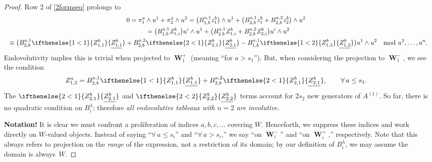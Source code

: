 \documentclass[pdftex]{sigma}
\numberwithin{equation}{section}
\DeclareMathOperator{\Wu}{\mathbf{W}}
\newcommand{\Z}[3]{\ifthenelse{#1<#2}{\ensuremath{Z^{#3}_{#1,#2}}}{\ensuremath{\underline{Z^{#3}_{#1,#2}}}}}
\begin{document}
\begin{proof}
Row 2 of \eqref{2formseq} prolongs to
\begin{gather*}
0 = \pi^a_1 \wedge u^1 + \pi^a_2 \wedge u^2
  =
    \big( B^{a,1}_{1,b} z^b_1 \big)\wedge u^1
   +\big( B^{a,1}_{2,b} z^b_1
         + B^{a,2}_{2,b} z^b_2 \big)\wedge u^2\\
\hphantom{0}{} =
    \big( B^{a,1}_{1,b} Z^b_{1,i} \big)u^i\wedge u^1
   +\big( B^{a,1}_{2,b} Z^b_{1,i}
         + B^{a,2}_{2,b} Z^b_{2,i} \big)u^i\wedge u^2\\
\hphantom{0}{}
\equiv
    \big( B^{a,1}_{2,b} \Z{1}{1}{b}
         + B^{a,2}_{2,b} \Z{2}{1}{b}
         - B^{a,1}_{1,b} \Z{1}{2}{b}
         \big)u^1\wedge u^2 \ \mod u^3, \ldots, u^n.
\end{gather*}
Endovolutivity implies this is trivial when projected to $\Wu^+_1$ (meaning
``for $a > s_1$''). But, when considering the projection to $\Wu^-_1$, we see
the condition
\begin{gather*}
Z^a_{1,2} =  B^{a,1}_{2,b}\Z{1}{1}{b} +
B^{a,2}_{2,b}\Z{2}{1}{b},\qquad \forall\, a \leq s_1.
\end{gather*}
The $\Z{2}{1}{b}$ and $\Z{2}{2}{b}$ terms account for
$2s_2$ new generators of $A^{(1)}$.  So far, there is no quadratic condition on
$B^\lambda_i$; therefore \emph{all endovolutive tableaux with $n=2$ are
involutive.}

\textbf{Notation!}  It is clear we must confront a proliferation of indices
$a,b,c,\ldots$ covering $W$.  Henceforth, we suppress these indices and work
directly on $W$-valued objects.  Instead of saying ``$\forall\,
a\leq s_i$'' and ``$\forall\, a > s_i$,'' we say ``on $\Wu^-_i$'' and ``on
$\Wu^+_i$,'' respectively.  Note that this always refers to
projection on the \emph{range} of the expression, not a restriction of its
domain; by our def\/inition of $B^\lambda_i$, we may assume the domain is always~$W$.


\end{proof}
\end{document}
